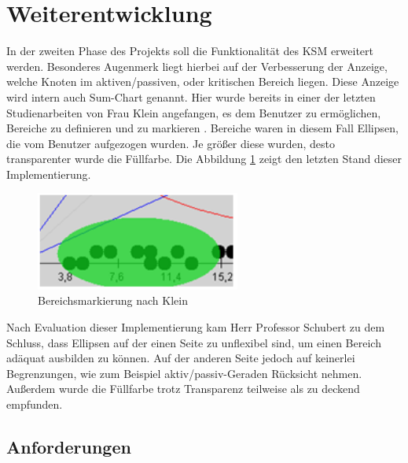 \section{Weiterentwicklung}

In der zweiten Phase des Projekts soll die Funktionalität des KSM erweitert werden. Besonderes Augenmerk liegt hierbei auf der Verbesserung der Anzeige, welche Knoten im aktiven/passiven, oder kritischen Bereich liegen. Diese Anzeige wird intern auch Sum-Chart genannt. Hier wurde bereits in einer der letzten Studienarbeiten von Frau Klein angefangen, es dem Benutzer zu ermöglichen, Bereiche zu definieren und zu markieren \cite{bib:klein}. Bereiche waren in diesem Fall Ellipsen, die vom Benutzer aufgezogen wurden. Je größer diese wurden, desto transparenter wurde die Füllfarbe. Die Abbildung \ref{ellipse} zeigt den letzten Stand dieser Implementierung.
\begin{figure}[h]
	\centering
	\includegraphics[width=0.6\textwidth]{pictures/ellipse.png}
	\caption{Bereichsmarkierung nach Klein \cite{bib:klein}}
	\label{ellipse}
\end{figure}

Nach Evaluation dieser Implementierung kam Herr Professor Schubert zu dem Schluss, dass Ellipsen auf der einen Seite zu unflexibel sind, um einen Bereich adäquat ausbilden zu können. Auf der anderen Seite jedoch auf keinerlei Begrenzungen, wie zum Beispiel aktiv/passiv-Geraden  Rücksicht nehmen. Außerdem wurde die Füllfarbe trotz Transparenz teilweise als zu deckend empfunden.

\subsection{Anforderungen}

